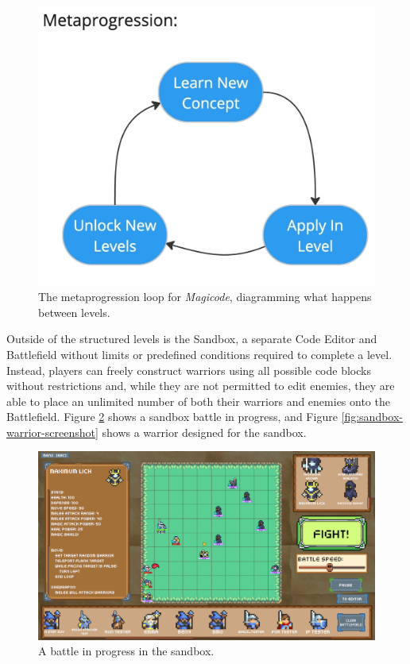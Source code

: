 \documentclass[10pt,twocolumn]{article}
\begin{document}
\begin{figure}
    \centering
    \includegraphics[width=.7\linewidth]{images/metaprogression-loop.jpeg}
    \caption{The metaprogression loop for \textit{Magicode}, diagramming what happens between levels.}
    \label{fig:metaprogression-loop}
\end{figure}

Outside of the structured levels is the Sandbox, a separate Code Editor and Battlefield without limits or predefined conditions required to complete a level. Instead, players can freely construct warriors using all possible code blocks without restrictions and, while they are not permitted to edit enemies, they are able to place an unlimited number of both their warriors and enemies onto the Battlefield. Figure \ref{fig:sandbox-battle-screenshot} shows a sandbox battle in progress, and Figure \ref{fig:sandbox-warrior-screenshot} shows a warrior designed for the sandbox.

\begin{figure}
    \centering
    \includegraphics[width=\linewidth]{images/screenshots/sandbox_battle_3.png}
    \caption{A battle in progress in the sandbox.}
    \label{fig:sandbox-battle-screenshot}
\end{figure}
\end{document}
